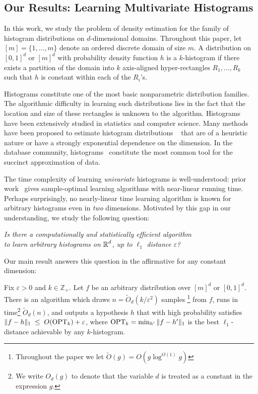 \documentclass[final,12pt]{colt2018} %
\newcommand{\eps}{\varepsilon}
\newcommand{\new}[1]{{\color{red} #1}}
\newcommand{\new}[1]{{#1}}
\begin{document}
\subsection{Our Results: Learning Multivariate Histograms}  \label{ssec:results}

In this work, we study the problem of density estimation for the family of histogram distributions on $d$-dimensional domains. 
Throughout this paper, let $[m] = \{1, \ldots, m\}$ denote an ordered discrete domain of size $m$.
A distribution on $[0, 1]^d$ or $[m]^d$ with probability density function $h$ 
is a $k$-histogram if there exists a partition of the domain 
into $k$ axis-aligned hyper-rectangles $R_1, \ldots, R_k$ such that $h$ is constant 
within each of the $R_i$'s.

Histograms constitute one of the most basic nonparametric distribution families.
The algorithmic difficulty in learning such distributions lies in the fact 
that the location and size of these rectangles is unknown to the algorithm. 
Histograms have been extensively studied in statistics and computer science. 
Many methods have been proposed to estimate histogram distributions
~\cite{Scott79, FreedmanD1981, Scott:92, LN96, Devroye2004, WillettN07, Klem09} that
are of a heuristic nature or have a strongly exponential dependence on the dimension. 
In the database community, histograms~\cite{JPK+98,CMN98,TGIK02,GGI+02, GKS06, ILR12, ADHLS15} 
constitute the most common tool for the succinct approximation of data.

The time complexity of learning {\em univariate}
histograms is well-understood: prior work~\cite{CDSS13, CDSS14, CDSS14b, ADLS17}
gives sample-optimal learning algorithms with near-linear running time.
\new{Perhaps surprisingly, no nearly-linear time learning algorithm is known for arbitrary histograms 
even in {\em two} dimensions.
Motivated by this gap in our understanding}, we study the following question: 
\begin{center}
{\em Is there a computationally and statistically efficient algorithm 
\\ to learn arbitrary histograms on $\operatorname{\mathbb{R}}^d$, up to $\ell_1$ distance $\eps$?}
\end{center}

\noindent
\new{
Our main result answers this question in the affirmative for any constant dimension: 
}

\begin{theorem}
Fix $\eps > 0$ and $k \in \mathbb{Z}_+$.
Let $f$ be an arbitrary distribution over $[m]^d$ or $[0, 1]^d$.
There is an algorithm which draws $n = \tilde{O}_d(k/\eps^2)$ samples \footnote{Throughout the paper we let $\tilde{O}(g) = O(g \log^{O(1)} g)$} from $f$, runs in time\footnote{We write $O_d(g)$ to denote that the variable $d$ is treated as a constant in the expression $g$.}
$\tilde{O}_d(n)$, and outputs a hypothesis $h$ that with high probability satisfies
$\| f - h \|_1 \; \leq \; O(\OPT_k) + \eps$, where 
$\mathrm{OPT}_k = \min_{h'} \| f - h' \|_1$ is the best $\ell_1$-distance achievable by any $k$-histogram.
\end{theorem}
\end{document}
